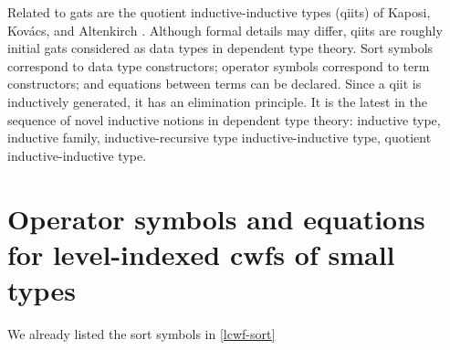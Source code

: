 \documentclass[11pt,a4paper]{article}
\theoremstyle{plain}
\theoremstyle{definition}
\def\lp{\mathrm{lp}}
\newcommand{\tuple}[1]{\langle #1 \rangle}
\def\p{\mathrm{p}}
\def\q{\mathrm{q}}
\begin{document}
Related to gats are the quotient inductive-inductive types (qiits) of Kaposi, Kov{\'{a}}cs, and Altenkirch
\cite{kaposi:qiits,kovacs:phd}. Although formal details may differ, qiits are roughly initial gats considered as data types in dependent type theory. Sort symbols correspond to data type constructors; operator symbols correspond to term constructors; and equations between terms can be declared. Since a qiit is inductively generated, it has an elimination principle. It is the latest in the sequence of novel inductive notions in dependent type theory: inductive type, inductive family, inductive-recursive type inductive-inductive type, quotient inductive-inductive type. 

\appendix
\section{Operator symbols and equations for level-indexed cwfs of small types}

We already listed the sort symbols in \ref{lcwf-sort}
\end{document}
